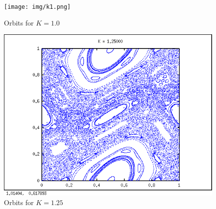\documentclass[a4paper,11pt]{article}
\begin{document}
\begin{figure}[H]
\centering
\begin{minipage}{0.5\textwidth}
\centering
\texttt{[image: img/k1.png]}
\caption{Orbits for $K = 1.0$}
\end{minipage}\hfill
\begin{minipage}{0.5\textwidth}
\centering
\includegraphics[width=\textwidth]{img/k125.png}
\caption{Orbits for $K = 1.25$}
\end{minipage}
\end{figure}
\end{document}
